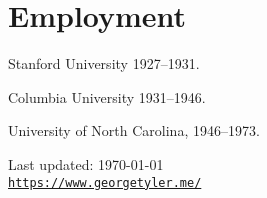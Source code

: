 \documentclass[letterpaper]{article}
\def\footerlink{https://www.georgetyler.me/}
\renewenvironment{itemize}{
  \begin{list}{}{
    \setlength{\leftmargin}{1.5em}
  }
}{
  \end{list}
}
\begin{document}
\section*{Employment}

\begin{itemize}
\item Stanford University 1927--1931.
\item Columbia University 1931--1946.
\item University of North Carolina, 1946--1973.
\end{itemize}







\bigskip

\begin{center}
  \begin{footnotesize}
    Last updated: \today \\
    \href{\footerlink}{\texttt{\footerlink}}
  \end{footnotesize}
\end{center}
\end{document}
